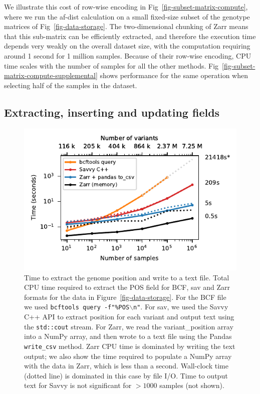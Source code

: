 \documentclass[a4paper,num-refs]{oup-contemporary}
\begin{document}
We illustrate this cost of row-wise encoding in
Fig~\ref{fig-subset-matrix-compute}, where we run the af-dist calculation
on a small fixed-size subset of the genotype matrices of
Fig~\ref{fig-data-storage}. The two-dimensional chunking of Zarr
means that this sub-matrix can be efficiently
extracted, and therefore the execution time depends very weakly on 
the overall dataset size, with the computation requiring around
1 second for 1 million samples. Because of their 
row-wise encoding, CPU time scales with the number of samples
for all the other methods.
Fig~\ref{fig-subset-matrix-compute-supplemental} shows performance
for the same operation when selecting half of the samples in the 
dataset.

\subsection{Extracting, inserting and updating fields}
\begin{figure}
\includegraphics{figures/column-extract}
\caption{Time to extract the genome position and write to a text file.
Total CPU time required to extract the POS field for BCF,
sav and Zarr formats
for the data in Figure~\ref{fig-data-storage}.
For the BCF file we used \texttt{bcftools query -f"\%POS$\backslash$n"}.
For sav, we used the Savvy C++ API to extract position for each variant
and output text using the \texttt{std::cout} stream. For Zarr, we read 
the variant\_position array into a NumPy array, and then wrote to
a text file using the Pandas \texttt{write\_csv} method. 
Zarr CPU time is dominated by writing the text output; we also show
the time required to populate a NumPy array with the data in Zarr,
which is less than a second. Wall-clock time (dotted line) is dominated 
in this case by file I/O. Time to output text for Savvy is not significant
for $> 1000$ samples (not shown).
\label{fig-column-extract}}
\end{figure}
\end{document}
